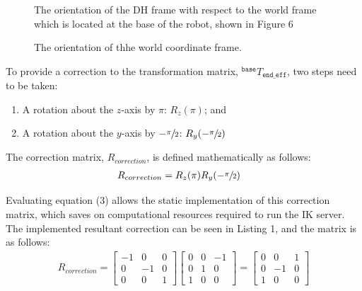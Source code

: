 \documentclass[a4paper]{article}
\begin{document}
\begin{figure}[h]
	\centering
	\begin{minipage}[t]{0.45\textwidth}
		\centering
		\caption{The orientation of the DH frame with respect to the world frame which is located at the base of the robot, shown in Figure 6}
	\end{minipage}
	\hspace{1cm}
	\begin{minipage}[t]{0.45\textwidth}
		\centering
		\caption{The orientation of thhe world coordinate frame.}
	\end{minipage}
\end{figure}
 \newpage
To provide a correction to the transformation matrix, $^\texttt{base} T_{\texttt{end\_eff}}$, two steps need to be taken:
\begin{enumerate}
	\item A rotation about the $z$-axis by $\pi$: $R_z(\pi)$; and
	\item A rotation about the $y$-axis by $-\sfrac{\pi}{2}$: $R_y(-\sfrac{\pi}{2})$
\end{enumerate}

The correction matrix, $R_{correction}$, is defined mathematically as follows:
\begin{align}
R_{correction} 	&= R_z(\pi) R_y(-\sfrac{\pi}{2})				
\end{align}

Evaluating equation (3) allows the static implementation of this correction matrix, which saves on computational resources required to run the IK server. The implemented resultant correction can be seen in Listing 1, and the matrix is as follows:
\begin{align}
R_{correction} = \begin{bmatrix}-1 & 0 & 0\\0 & -1 & 0\\0 & 0 & 1\end{bmatrix} \begin{bmatrix}0 & 0 & -1\\0 & 1 & 0\\1 & 0 & 0\end{bmatrix} = \begin{bmatrix}0 & 0 & 1\\0 & -1 & 0\\1 & 0 & 0\end{bmatrix}
\end{align}
\end{document}
